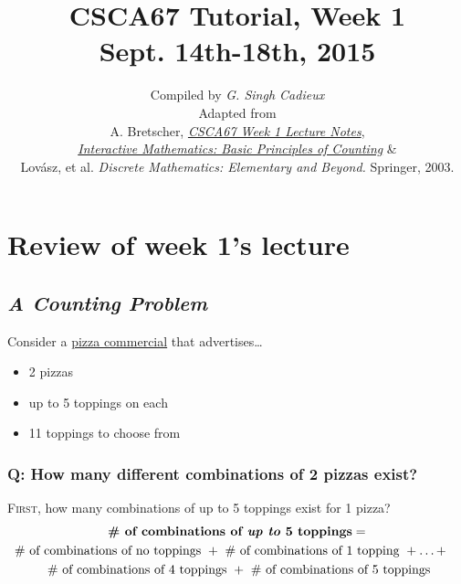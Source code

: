 \documentclass{article}
\title{\sc\LARGE CSCA67 Tutorial, Week 1\\
{\Large Sept. 14th-18th, 2015}}
\date{}
\author{\sc Compiled by {\em G. Singh Cadieux}\\[1ex]
\sc Adapted from\\
A. Bretscher, \href{http://www.utsc.utoronto.ca/~bretscher/a67/lectures/w1.pdf}{\em CSCA67 Week 1 Lecture Notes},\\
\href{http://www.intmath.com/counting-probability/2-basic-principles-counting.php}{\em Interactive Mathematics: Basic Principles of Counting} \&\\
Lov\'{a}sz, et al. \textit{Discrete Mathematics: Elementary and Beyond.} Springer, 2003.}
\begin{document}
\maketitle

\section{\sc Review of week 1's lecture}
\subsection*{\em A Counting Problem}

Consider a \href{https://www.youtube.com/watch?v=xak-onyKwyA}{pizza commercial} that advertises\dots
\begin{itemize}
\item 2 pizzas
\item up to 5 toppings on each
\item 11 toppings to choose from
\end{itemize}

\subsubsection*{\sc Q: How many different combinations of 2 pizzas exist?}
\textsc{First,} how many combinations of up to 5 toppings exist for 1 pizza?
\begin{multline*}
\text{\bf\# of combinations of \textit{up to} 5 toppings}=\\\text{\# of combinations of no toppings }+
\shoveright{\text{ \# of combinations of 1 topping }+\ldots+}\\
\text{ \# of combinations of 4 toppings }+\text{ \# of combinations of 5 toppings}
\end{multline*}
\end{document}

